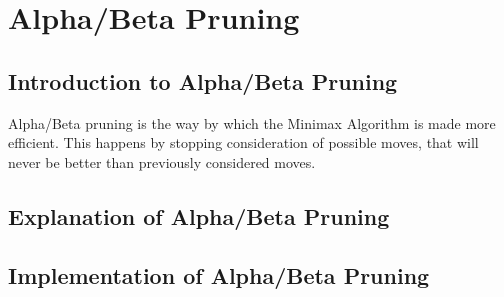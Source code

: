 \section{Alpha/Beta Pruning} 
\label{sec:Alpha/Beta Pruning}

\subsection{Introduction to Alpha/Beta Pruning}
\label{subsec:Introduction to Alpha/Beta Pruning}
Alpha/Beta pruning is the way by which the Minimax Algorithm is made more efficient.
This happens by stopping consideration of possible moves, that will never be better than previously considered moves.

\subsection{Explanation of Alpha/Beta Pruning}
\label{subsec:Explanation of Alpha/Beta Pruning}

\subsection{Implementation of Alpha/Beta Pruning}
\label{subsec:Implementation of Alpha/Beta Pruning}

\clearpage